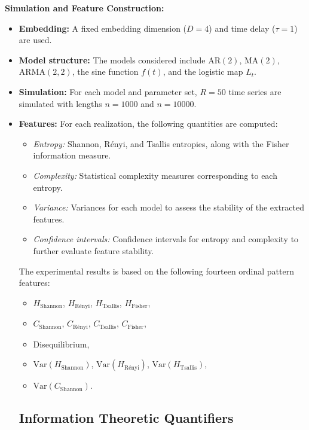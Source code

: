 \documentclass[12pt,a4paper]{article}
\begin{document}
\textbf{Simulation and Feature Construction:}
\begin{itemize}
	\item \textbf{Embedding:} A fixed embedding dimension ($D = 4$) and time delay ($\tau = 1$) are used.
	
	\item \textbf{Model structure:} The models considered include $\mathrm{AR}(2)$, $\mathrm{MA}(2)$, $\mathrm{ARMA}(2,2)$, the sine function $f(t)$, and the logistic map $L_t$.
	
	\item \textbf{Simulation:} For each model and parameter set, $R = 50$ time series are simulated with lengths $n = 1000$ and $n = 10000$.
	
	\item \textbf{Features:} For each realization, the following quantities are computed:
	\begin{itemize}
		\item \emph{Entropy:} Shannon, Rényi, and Tsallis entropies, along with the Fisher information measure.
		\item \emph{Complexity:} Statistical complexity measures corresponding to each entropy.
		\item \emph{Variance:} Variances for each model to assess the stability of the extracted features.
		\item \emph{Confidence intervals:} Confidence intervals for entropy and complexity to further evaluate feature stability.
	\end{itemize}
	The experimental results is based on the following fourteen ordinal pattern features:
	\begin{itemize}
		\item $H_{\text{Shannon}}$, $H_{\text{Rényi}}$, $H_{\text{Tsallis}}$, $H_{\text{Fisher}}$,
		\item $C_{\text{Shannon}}$, $C_{\text{Rényi}}$, $C_{\text{Tsallis}}$, $C_{\text{Fisher}}$,
		\item Disequilibrium,
		\item $\mathrm{Var}(H_{\text{Shannon}})$, $\mathrm{Var}(H_{\text{Rényi}})$, $\mathrm{Var}(H_{\text{Tsallis}})$,
		\item $\mathrm{Var}(C_{\text{Shannon}})$.
	\end{itemize}
	
\subsection*{Information Theoretic Quantifiers}


\end{itemize}
\end{document}
